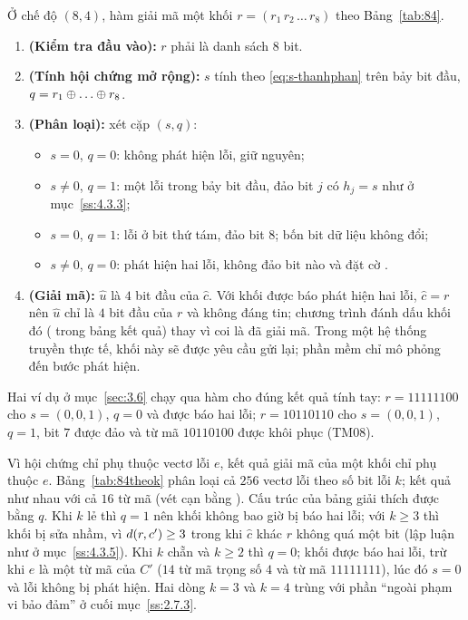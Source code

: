 Ở chế độ $(8,4)$, hàm  giải mã một khối
$r = (r_1\,r_2\,\dots\,r_8)$ theo Bảng~\ref{tab:84}.
\begin{enumerate}[label=\textbf{Bước~\arabic*},leftmargin=2.3cm,labelwidth=1.7cm,labelsep=0.6em,align=left]
  \item \textbf{(Kiểm tra đầu vào):} $r$ phải là danh sách $8$ bit.
  \item \textbf{(Tính hội chứng mở rộng):} $s$ tính theo
        \eqref{eq:s-thanhphan} trên bảy bit đầu, $q = r_1 \xor \dots \xor r_8$.
  \item \textbf{(Phân loại):} xét cặp $(s, q)$:
        \begin{itemize}
          \item $s = 0$, $q = 0$: không phát hiện lỗi, giữ nguyên;
          \item $s \neq 0$, $q = 1$: một lỗi trong bảy bit đầu, đảo bit $j$ có
                $h_j = s$ như ở mục~\ref{ss:4.3.3};
          \item $s = 0$, $q = 1$: lỗi ở bit thứ tám, đảo bit $8$; bốn bit dữ
                liệu không đổi;
          \item $s \neq 0$, $q = 0$: phát hiện hai lỗi, không đảo bit nào và
                đặt cờ .
        \end{itemize}
  \item \textbf{(Giải mã):} $\hat{u}$ là $4$ bit đầu của $\hat{c}$. Với khối
        được báo phát hiện hai lỗi, $\hat{c} = r$ nên $\hat{u}$ chỉ là $4$ bit
        đầu của $r$ và không đáng tin; chương trình đánh dấu khối đó
        ( trong bảng kết quả) thay vì coi là đã giải mã. Trong
        một hệ thống truyền thực tế, khối này sẽ được yêu cầu gửi lại; phần mềm
        chỉ mô phỏng đến bước phát hiện.
\end{enumerate}
Hai ví dụ ở mục~\ref{sec:3.6} chạy qua hàm cho đúng kết quả tính tay:
$r = 11111100$ cho $s = (0,0,1)$, $q = 0$ và được báo hai lỗi; $r = 10110110$
cho $s = (0,0,1)$, $q = 1$, bit $7$ được đảo và từ mã $10110100$ được khôi
phục (TM08).

Vì hội chứng chỉ phụ thuộc vectơ lỗi $e$, kết quả giải mã của một khối chỉ phụ
thuộc $e$. Bảng~\ref{tab:84theok} phân loại cả $256$ vectơ lỗi theo số bit lỗi
$k$; kết quả như nhau với cả $16$ từ mã (vét cạn bằng ).
Cấu trúc của bảng giải thích được bằng $q$. Khi $k$ lẻ thì $q = 1$ nên khối
không bao giờ bị báo hai lỗi; với $k \ge 3$ thì khối bị sửa nhầm, vì
$d(r,c') \ge 3$ trong khi $\hat{c}$ khác $r$ không quá một bit (lập luận
như ở mục~\ref{ss:4.3.5}). Khi $k$ chẵn và $k \ge 2$ thì $q = 0$; khối được báo
hai lỗi, trừ khi $e$ là một từ mã của $C'$ ($14$ từ mã trọng số $4$ và từ mã
$11111111$), lúc đó $s = 0$ và lỗi không bị phát hiện. Hai dòng $k = 3$ và
$k = 4$ trùng với phần ``ngoài phạm vi bảo đảm'' ở cuối mục~\ref{ss:2.7.3}.

